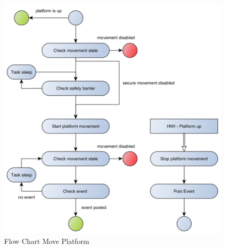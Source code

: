 \begin{figure}[H]
	\begin{center}
		\includegraphics[scale=.40]{media/Flow_Chart_MovePlatform.png} 	
		\caption{Flow Chart Move Platform}
		\label{fig:moveplatform}
	\end{center}
\end{figure}